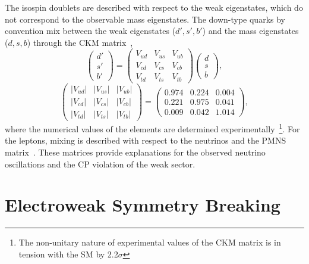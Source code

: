 The isospin doublets are described with respect to the weak eigenstates, which do not correspond to the observable mass eigenstates.
The down-type quarks by convention mix between the weak eigenstates ($d', s', b'$) and the mass eigenstates ($d, s, b$) through the \Gls{CKM} matrix~\cite{cabibbo1963, CPViolationRenormalizableTheory},
\begin{equation}
    \label{eq:ckm_matrix}
    \begin{pmatrix} d' \\ s' \\ b' \end{pmatrix} =
    \begin{pmatrix} V_{ud} & V_{us} & V_{ub} \\ V_{cd} & V_{cs} & V_{cb} \\ V_{td} & V_{ts} & V_{tb} \end{pmatrix} \begin{pmatrix} d \\ s \\ b \end{pmatrix},
\end{equation}
\begin{equation}
    \label{eq:ckm2_matrix}
    \begin{pmatrix} |V_{ud}| & |V_{us}| & |V_{ub}| \\ |V_{cd}| & |V_{cs}| & |V_{cb}| \\ |V_{td}| & |V_{ts}| & |V_{tb}| \end{pmatrix} =
    \begin{pmatrix} 0.974 & 0.224 & 0.004 \\ 0.221 & 0.975 & 0.041 \\ 0.009 & 0.042 & 1.014 \end{pmatrix},
\end{equation}
where the numerical values of the elements are determined experimentally~\cite{ParticleDataGroup}\footnote{The non-unitary nature of experimental values of the \Gls{CKM} matrix is in tension with the \Gls{SM} by 2.2$\sigma$}.
For the leptons, mixing is described with respect to the neutrinos and the \Gls{PMNS} matrix~\cite{Pontecorvo:1957qd, PMNSMatrix}.
These matrices provide explanations for the observed neutrino oscillations and the CP violation of the weak sector.

\section{Electroweak Symmetry Breaking}
\label{sec:higgs}

